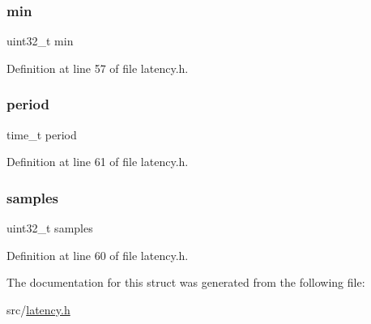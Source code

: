 \subsubsection{\texorpdfstring{min}{min}}
{\footnotesize\ttfamily uint32\+\_\+t min}



Definition at line 57 of file latency.\+h.

\mbox{\label{structlatency_stats_a831ec502008ebff1a36b504a8360dafc}} 
\subsubsection{\texorpdfstring{period}{period}}
{\footnotesize\ttfamily time\+\_\+t period}



Definition at line 61 of file latency.\+h.

\mbox{\label{structlatency_stats_a7d9d22b1c0ac2b68b57d12ec96f54b79}} 
\subsubsection{\texorpdfstring{samples}{samples}}
{\footnotesize\ttfamily uint32\+\_\+t samples}



Definition at line 60 of file latency.\+h.



The documentation for this struct was generated from the following file\+:\begin{DoxyCompactItemize}
\item 
src/\hyperlink{latency_8h}{latency.\+h}\end{DoxyCompactItemize}
